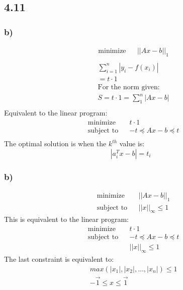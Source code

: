 \documentclass[12pt]{article}
\begin{document}
\subsection*{4.11}

\subsubsection*{b)}

\begin{equation*}
\begin{aligned}
& {\text{minimize}}
& & ||Ax-b||_1\\
\end{aligned}
\end{equation*}
\begin{equation*}
\begin{aligned}
& \sum_{i=1}^{n}|y_i-f(x_i)|\\
& = t\cdot1\\
& \text{For the norm given: }\\
& S = t\cdot1 = \sum_{1}^{n}|Ax-b|\\
\end{aligned}
\end{equation*}
Equivalent to the linear program:
\begin{equation*}
\begin{aligned}
& {\text{minimize}}
& & t\cdot1\\
& \text{subject to}
& & -t \preceq Ax-b \preceq t \\
\end{aligned}
\end{equation*}
The optimal solution is when the $k^{th}$ value is: $$|a_i^Tx-b|=t_i$$

\subsubsection*{b)}

\begin{equation*}
\begin{aligned}
& {\text{minimize}}
& & ||Ax-b||_1\\
& \text{subject to}
& & ||x||_{\infty} \le 1
\end{aligned}
\end{equation*}
This is equivalent to the linear program:
\begin{equation*}
\begin{aligned}
& {\text{minimize}}
& & t\cdot1\\
& \text{subject to}
& & -t \preceq Ax-b \preceq t \\
&&& ||x||_{\infty} \le 1
\end{aligned}
\end{equation*}
The last constraint is equivalent to:
\begin{equation*}
\begin{aligned}
& max(|x_1|,|x_2|,\dots,|x_n|) \le 1\\
& -\vec{1} \le x \le \vec{1}
\end{aligned}
\end{equation*}
\end{document}
